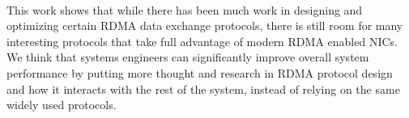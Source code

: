 \paragraph{} This work shows that while there has been much work in designing and optimizing certain RDMA data
exchange protocols, there is still room for many interesting protocols that take full advantage of modern RDMA enabled NICs.
We think that systems engineers can significantly improve overall system performance by putting more thought and research in
RDMA protocol design and how it interacts with the rest of the system, instead of relying on the same widely used protocols.
